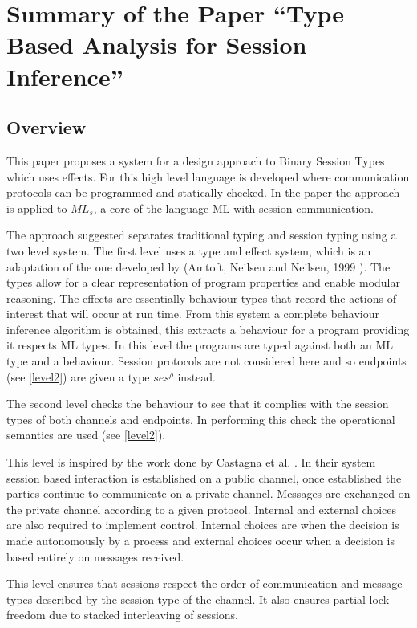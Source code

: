 \chapter{Summary of the Paper ``Type Based Analysis for Session Inference''}

\section{Overview} \label{overview}
This paper\cite{paper1} proposes a system for a design approach to Binary Session Types which uses effects. For this high level language is developed where communication protocols can be programmed and statically checked. In the paper the approach is applied to $ML_s$, a core of the language ML with session communication.

The approach suggested separates traditional typing and session typing using a two level system. The first level uses a type and effect system, which is an adaptation of the one developed by (Amtoft, Neilsen and Neilsen, 1999 )\cite{amtoft}. The types allow for a clear representation of program properties and enable modular reasoning. The effects are essentially behaviour types that record the actions of interest that will occur at run time. From this system a complete behaviour inference algorithm is obtained, this extracts a behaviour for a program providing it respects ML types. In this level the programs are typed against both an ML type and a behaviour. Session protocols are not considered here and so endpoints (see \ref{level2}) are given a type $ses^\rho$ instead.   

The second level checks the behaviour to see that it complies with the session types of both channels and endpoints. In performing this check the operational semantics are used (see \ref{level2}). 

This level is inspired by the work done by Castagna et al. \cite{foundSessTypes}. In their system session based interaction is established on a public channel, once established the parties continue to communicate on a private channel. Messages are exchanged on the private channel according to a given protocol. Internal and external choices are also required to implement control. Internal choices are when the decision is made autonomously by a process and external choices occur when a decision is based entirely on messages received. 

This level ensures that sessions respect the order of communication and message types described by the session type of the channel. It also ensures partial lock freedom due to stacked interleaving of sessions. 

